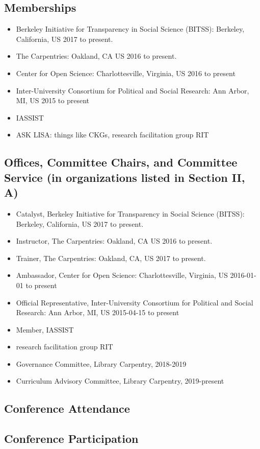 
\subsection{Memberships}

\begin{itemize}
\item Berkeley Initiative for Transparency in Social Science (BITSS): Berkeley, California, US 2017 to present.
\item The Carpentries: Oakland, CA US 2016 to present.
\item Center for Open Science: Charlottesville, Virginia, US 2016 to present
\item Inter-University Consortium for Political and Social Research: Ann Arbor, MI, US 2015 to present 
\item IASSIST
\item ASK LISA: things like CKGs, research facilitation group RIT
\end{itemize}

\subsection{Offices, Committee Chairs, and Committee Service (in organizations listed in Section II, A)}

\begin{itemize}
    \item Catalyst, Berkeley Initiative for Transparency in Social Science (BITSS): Berkeley, California, US 2017 to present.
    \item Instructor, The Carpentries: Oakland, CA US 2016 to present.
    \item Trainer, The Carpentries: Oakland, CA, US  2017 to present.
    \item Ambassador, Center for Open Science: Charlottesville, Virginia, US 2016-01-01 to present
    \item Official Representative, Inter-University Consortium for Political and Social Research: Ann Arbor, MI, US 2015-04-15 to present
    \item Member, IASSIST
    \item research facilitation group RIT
    \item Governance Committee, Library Carpentry, 2018-2019
    \item Curriculum Advisory Committee, Library Carpentry, 2019-present
\end{itemize}


\subsection{Conference Attendance}



\subsection{Conference Participation}

